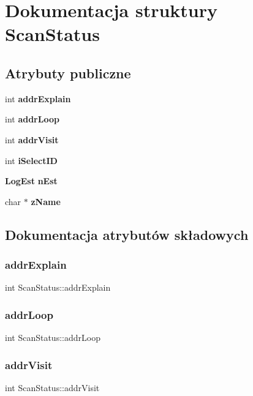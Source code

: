 \section{Dokumentacja struktury Scan\+Status}
\label{struct_scan_status}
\subsection*{Atrybuty publiczne}
\begin{DoxyCompactItemize}
\item 
int \textbf{ addr\+Explain}
\item 
int \textbf{ addr\+Loop}
\item 
int \textbf{ addr\+Visit}
\item 
int \textbf{ i\+Select\+ID}
\item 
\textbf{ Log\+Est} \textbf{ n\+Est}
\item 
char $\ast$ \textbf{ z\+Name}
\end{DoxyCompactItemize}


\subsection{Dokumentacja atrybutów składowych}
\mbox{\label{struct_scan_status_a621d9ae1f07b7730f1e5e2a5a0473a2e}} 
\subsubsection{addrExplain}
{\footnotesize\ttfamily int Scan\+Status\+::addr\+Explain}

\mbox{\label{struct_scan_status_a9a6acff15920d8de4b97a3d3fd6781d9}} 
\subsubsection{addrLoop}
{\footnotesize\ttfamily int Scan\+Status\+::addr\+Loop}

\mbox{\label{struct_scan_status_a31523fd6dd0dfca1233b51606140b740}} 
\subsubsection{addrVisit}
{\footnotesize\ttfamily int Scan\+Status\+::addr\+Visit}

